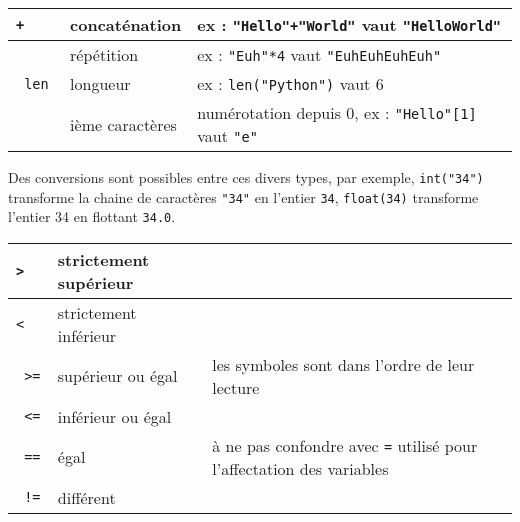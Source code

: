 \documentclass[11pt,a4paper]{article}
\begin{document}
\begin{tcolorbox}[left=0cm,title=\bf{\faPython \; Types de bases et opérateurs associés},colbacktitle=cfond]
\begin{itemize}
	\begin{tabularx}{\linewidth}{|>{\tt}l|l|X|}
		\hline
		+ & concaténation & ex : {\tt "Hello"+"World"} vaut {\tt "HelloWorld"}\\
		\hline
		* & répétition & ex : {\tt "Euh"*4} vaut {\tt "EuhEuhEuhEuh"} \\
		\hline
		len & longueur & ex : {\tt len("Python")} vaut 6 \\
		\hline
		[] & ième caractères & numérotation depuis 0, ex : {\tt "Hello"[1]} vaut {\tt "e"}\\
		\hline
	 \end{tabularx}
\end{itemize}
Des conversions sont possibles entre ces divers types, par exemple, \texttt{int("34")} transforme la chaine de caractères {\tt "34"} en l'entier {\tt 34}, \texttt{float(34)} transforme l'entier 34 en flottant {\tt 34.0}.
\end{tcolorbox}

\begin{tcolorbox}[left=0cm,title=\bf{\faPython \; Comparaison},colbacktitle=cfond]
	\begin{tabularx}{\linewidth}{|>{\tt}l|l|X|}
		\hline
		> & strictement supérieur & \\
		\hline
		< & strictement inférieur & \\
		\hline
		>= & supérieur ou égal & les symboles sont dans l'ordre de leur lecture\\
		\hline
		<= & inférieur ou égal & \\
		\hline
		== & égal & {\small \danger} à ne pas confondre avec {\tt =} utilisé pour l'affectation des variables \\
		\hline
		!= & différent & \\
		\hline
	\end{tabularx}
\end{tcolorbox}
\end{document}
